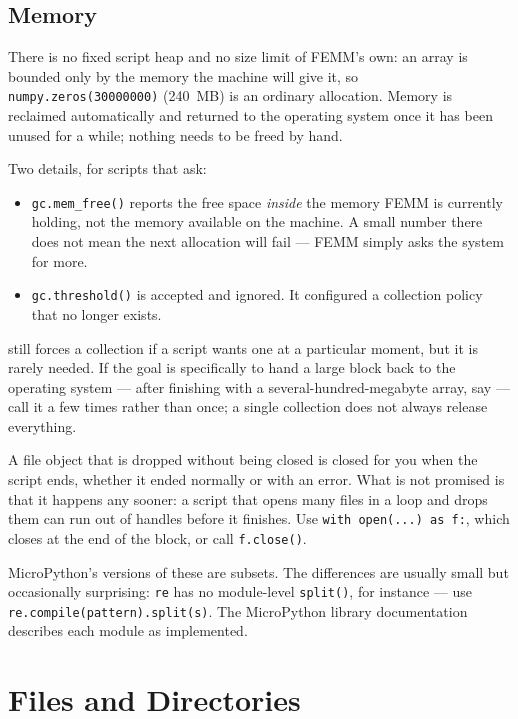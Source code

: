 \subsection*{Memory}

There is no fixed script heap and no size limit of FEMM's own: an array is
bounded only by the memory the machine will give it, so
\verb+numpy.zeros(30000000)+ (240~MB) is an ordinary allocation.  Memory is
reclaimed automatically and returned to the operating system once it has been
unused for a while; nothing needs to be freed by hand.

Two details, for scripts that ask:

\begin{itemize}
\item{\tt gc.mem\_free()} reports the free space {\em inside} the memory FEMM
is currently holding, not the memory available on the machine.  A small number
there does not mean the next allocation will fail --- FEMM simply asks the
system for more.
\item{\tt gc.threshold()} is accepted and ignored.  It configured a collection
policy that no longer exists.
\end{itemize}

 still forces a collection if a script wants one at
a particular moment, but it is rarely needed.  If the goal is specifically to
hand a large block back to the operating system --- after finishing with a
several-hundred-megabyte array, say --- call it a few times rather than once;
a single collection does not always release everything.

A file object that is dropped without being closed is closed for you when the
script ends, whether it ended normally or with an error.  What is not promised
is that it happens any sooner: a script that opens many files in a loop and
drops them can run out of handles before it finishes.  Use
\verb+with open(...) as f:+, which closes at the end of the block, or call
{\tt f.close()}.

MicroPython's versions of these are subsets.  The differences are usually
small but occasionally surprising: {\tt re} has no module-level
{\tt split()}, for instance --- use \verb+re.compile(pattern).split(s)+.
The MicroPython library documentation describes each module as implemented.

\section{Files and Directories}

